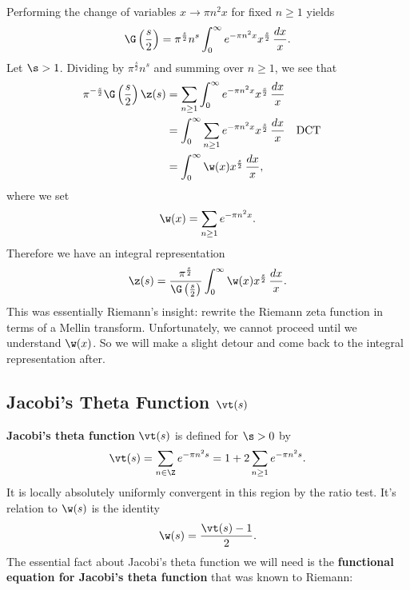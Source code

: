       Performing the change of variables $x \to \pi n^{2}x$ for fixed $n \ge 1$ yields
      \begin{equation}\label{equ:gamma_integral_substitution}
        \G\left(\frac{s}{2}\right) = \pi^{\frac{s}{2}} n^{s}\int_{0}^{\infty}e^{-\pi n^{2}x}x^{\frac{s}{2}}\,\frac{dx}{x}.
      \end{equation}
      Let $\s > 1$. Dividing by $\pi^{\frac{s}{2}}n^{s}$ and summing over $n \ge 1$, we see that
      \begin{align*}
        \pi^{-\frac{s}{2}}\G\left(\frac{s}{2}\right)\z(s) &= \sum_{n \ge 1}\int_{0}^{\infty}e^{-\pi n^{2}x}x^{\frac{s}{2}}\,\frac{dx}{x} \\
        &= \int_{0}^{\infty}\sum_{n \ge 1}e^{-\pi n^{2}x}x^{\frac{s}{2}}\,\frac{dx}{x} && \text{DCT} \\
        &= \int_{0}^{\infty}\w(x)x^{\frac{s}{2}}\,\frac{dx}{x},
      \end{align*}
      where we set
      \[
        \w(x) = \sum_{n \ge 1}e^{-\pi n^{2}x}.
      \]
      Therefore we have an integral representation
      \begin{equation}\label{equ:integral_representation_zeta_1}
        \z(s) = \frac{\pi^{\frac{s}{2}}}{\G\left(\frac{s}{2}\right)}\int_{0}^{\infty}\w(x)x^{\frac{s}{2}}\,\frac{dx}{x}.
      \end{equation}
      This was essentially Riemann's insight: rewrite the Riemann zeta function in terms of a Mellin transform. Unfortunately, we cannot proceed until we understand $\w(x)$. So we will make a slight detour and come back to the integral representation after.
    \subsection*{Jacobi's Theta Function \texorpdfstring{$\vt(s)$}{\vt(s)}}
      \textbf{Jacobi's theta function} $\vt(s)$ is defined for $\s > 0$ by
      \[
        \vt(s) = \sum_{n \in \Z}e^{-\pi n^{2}s} = 1+2\sum_{n \ge 1}e^{-\pi n^{2}s}.
      \]
      It is locally absolutely uniformly convergent in this region by the ratio test. It's relation to $\w(s)$ is the identity
      \begin{equation}\label{equ:omega_theta_relationship_for_zeta}
        \w(s) = \frac{\vt(s)-1}{2}.
      \end{equation}
      The essential fact about Jacobi's theta function we will need is the \textbf{functional equation for Jacobi's theta function} that was known to Riemann:

